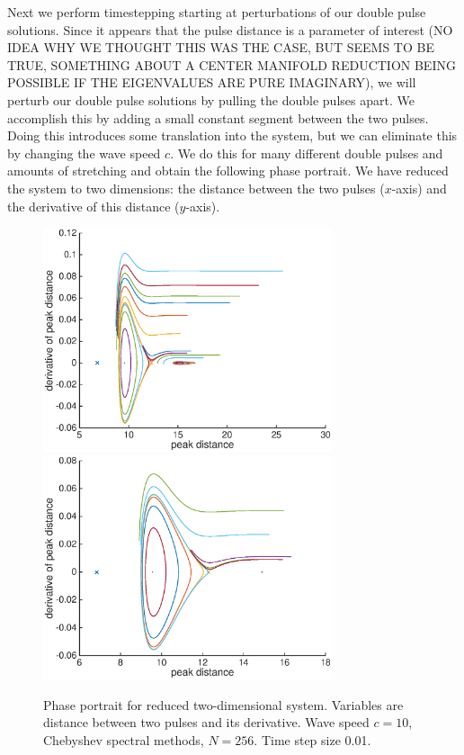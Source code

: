 \documentclass[12pt]{article}
\begin{document}
Next we perform timestepping starting at perturbations of our double pulse solutions. Since it appears that the pulse distance is a parameter of interest (NO IDEA WHY WE THOUGHT THIS WAS THE CASE, BUT SEEMS TO BE TRUE, SOMETHING ABOUT A CENTER MANIFOLD REDUCTION BEING POSSIBLE IF THE EIGENVALUES ARE PURE IMAGINARY), we will perturb our double pulse solutions by pulling the double pulses apart. We accomplish this by adding a small constant segment between the two pulses. Doing this introduces some translation into the system, but we can eliminate this by changing the wave speed $c$. We do this for many different double pulses and amounts of stretching and obtain the following phase portrait. We have reduced the system to two dimensions: the distance between the two pulses ($x$-axis) and the derivative of this distance ($y$-axis).

\begin{figure}[H]
	\includegraphics[width=8.5cm]{phaseportrait1}
	\includegraphics[width=8.5cm]{phaseportrait2}
	\caption{Phase portrait for reduced two-dimensional system. Variables are distance between two pulses and its derivative. Wave speed $c = 10$, Chebyshev spectral methods, $N = 256$. Time step size 0.01.}
\end{figure}
\end{document}
